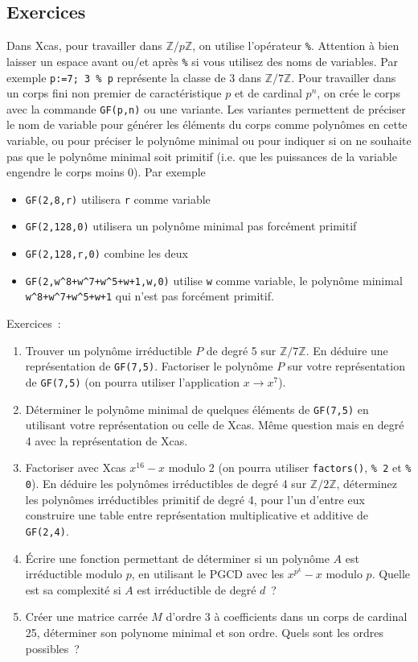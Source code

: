 \documentclass[a4paper,11pt]{article}
\begin{document}
\begin{giacjshere}
\subsection{Exercices}
Dans Xcas, pour travailler dans $\mathbb{Z}/p\mathbb{Z}$, on utilise l'op\'erateur \verb|%|.
Attention \`a bien laisser un espace avant ou/et apr\`es \verb|%| si vous 
utilisez des noms de variables. Par exemple \verb|p:=7; 3 % p| repr\'esente
la classe de 3 dans $\mathbb{Z}/7\mathbb{Z}$.
Pour travailler dans un corps fini non premier de caract\'eristique $p$
et de cardinal $p^n$,
on cr\'ee le corps avec la commande \verb|GF(p,n)| ou une variante.
Les variantes permettent de pr\'eciser le nom de variable pour 
g\'en\'erer les \'el\'ements du corps comme polyn\^omes en cette variable, 
ou pour pr\'eciser le polyn\^ome minimal ou pour indiquer si on ne souhaite
pas que le polyn\^ome minimal soit primitif (i.e. que les puissances
de la variable engendre le corps moins 0). Par exemple
\begin{itemize}
\item \verb|GF(2,8,r)| utilisera \verb|r| comme variable
\item \verb|GF(2,128,0)| utilisera un polyn\^ome minimal pas forc\'ement 
primitif
\item \verb|GF(2,128,r,0)| combine les deux
\item \verb|GF(2,w^8+w^7+w^5+w+1,w,0)| utilise \verb|w| comme variable,
le polyn\^ome minimal \verb|w^8+w^7+w^5+w+1| qui n'est pas forc\'ement
primitif.
\end{itemize}

Exercices~:
\begin{enumerate}
\item Trouver un polyn\^ome irr\'eductible $P$ de degr\'e 5 sur $\mathbb{Z}/7\mathbb{Z}$.
En d\'eduire une repr\'esentation de \verb|GF(7,5)|. Factoriser 
le polyn\^ome $P$ sur votre repr\'esentation de \verb|GF(7,5)| (on pourra utiliser
l'application $x \rightarrow x^7$).
\item D\'eterminer le polyn\^ome minimal de quelques \'el\'ements
de \verb|GF(7,5)| en utilisant votre repr\'esentation ou celle de Xcas.
M\^eme question mais en degr\'e 4 avec la repr\'esentation de Xcas.
\item Factoriser avec Xcas $x^{16}-x$ modulo 2 (on pourra utiliser
\verb|factors()|, \verb|% 2| et \verb|% 0|). 
En d\'eduire les polyn\^omes irr\'eductibles de degr\'e 4 sur
  $\mathbb{Z}/2\mathbb{Z}$, d\'eterminez les polyn\^omes irr\'eductibles
primitif de degr\'e 4, pour l'un d'entre eux construire une table entre repr\'esentation
multiplicative et additive de \verb|GF(2,4)|.
\item \'Ecrire une fonction permettant de d\'eterminer si un
  polyn\^ome $A$ est irr\'eductible modulo $p$, en utilisant le
PGCD avec les $x^{p^k}-x$ modulo $p$. Quelle est sa complexit\'e
si $A$ est irr\'eductible de degr\'e $d$~?
\item Cr\'eer une matrice carr\'ee $M$ d'ordre 3 \`a coefficients
dans un corps de cardinal 25, d\'eterminer son polynome
minimal et son ordre. Quels sont les ordres possibles~?
\end{enumerate}


\end{giacjshere}
\end{document}
